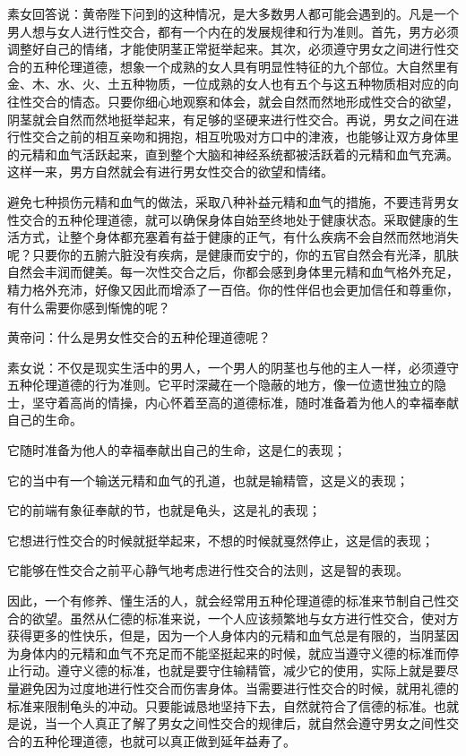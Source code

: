 \documentclass[a4paper,12pt,UTF8,twoside]{ctexbook}
\begin{document}
素女回答说：黄帝陛下问到的这种情况，是大多数男人都可能会遇到的。凡是一个男人想与女人进行性交合，都有一个内在的发展规律和行为准则。首先，男方必须调整好自己的情绪，才能使阴茎正常挺举起来。其次，必须遵守男女之间进行性交合的五种伦理道德，想象一个成熟的女人具有明显性特征的九个部位。大自然里有金、木、水、火、土五种物质，一位成熟的女人也有五个与这五种物质相对应的向往性交合的情态。只要你细心地观察和体会，就会自然而然地形成性交合的欲望，阴茎就会自然而然地挺举起来，有足够的坚硬来进行性交合。再说，男女之间在进行性交合之前的相互亲吻和拥抱，相互吮吸对方口中的津液，也能够让双方身体里的元精和血气活跃起来，直到整个大脑和神经系统都被活跃着的元精和血气充满。这样一来，男方自然就会有进行男女性交合的欲望和情绪。

避免七种损伤元精和血气的做法，采取八种补益元精和血气的措施，不要违背男女性交合的五种伦理道德，就可以确保身体自始至终地处于健康状态。采取健康的生活方式，让整个身体都充塞着有益于健康的正气，有什么疾病不会自然而然地消失呢？只要你的五腑六脏没有疾病，是健康而安宁的，你的五官自然会有光泽，肌肤自然会丰润而健美。每一次性交合之后，你都会感到身体里元精和血气格外充足，精力格外充沛，好像又因此而增添了一百倍。你的性伴侣也会更加信任和尊重你，有什么需要你感到惭愧的呢？

黄帝问：什么是男女性交合的五种伦理道德呢？

素女说：不仅是现实生活中的男人，一个男人的阴茎也与他的主人一样，必须遵守五种伦理道德的行为准则。它平时深藏在一个隐蔽的地方，像一位遗世独立的隐士，坚守着高尚的情操，内心怀着至高的道德标准，随时准备着为他人的幸福奉献自己的生命。

它随时准备为他人的幸福奉献出自己的生命，这是仁的表现；

它的当中有一个输送元精和血气的孔道，也就是输精管，这是义的表现；

它的前端有象征奉献的节，也就是龟头，这是礼的表现；

它想进行性交合的时候就挺举起来，不想的时候就戛然停止，这是信的表现；

它能够在性交合之前平心静气地考虑进行性交合的法则，这是智的表现。

因此，一个有修养、懂生活的人，就会经常用五种伦理道德的标准来节制自己性交合的欲望。虽然从仁德的标准来说，一个人应该频繁地与女方进行性交合，使对方获得更多的性快乐，但是，因为一个人身体内的元精和血气总是有限的，当阴茎因为身体内的元精和血气不充足而不能坚挺起来的时候，就应当遵守义德的标准而停止行动。遵守义德的标准，也就是要守住输精管，减少它的使用，实际上就是要尽量避免因为过度地进行性交合而伤害身体。当需要进行性交合的时候，就用礼德的标准来限制龟头的冲动。只要能诚恳地坚持下去，自然就符合了信德的标准。也就是说，当一个人真正了解了男女之间性交合的规律后，就自然会遵守男女之间性交合的五种伦理道德，也就可以真正做到延年益寿了。
\end{document}
